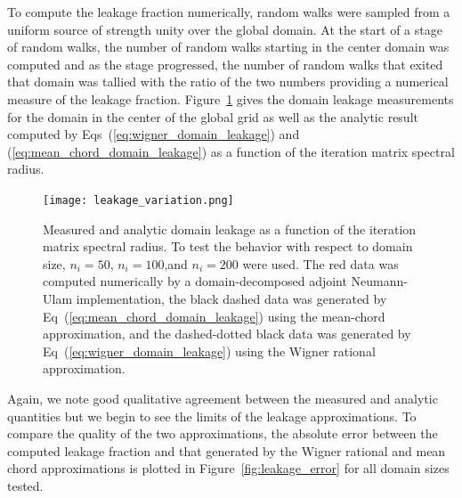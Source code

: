 \documentclass[preprint,11pt]{elsarticle}
\begin{document}
To compute the leakage fraction numerically,  random walks were
sampled from a uniform source of strength unity over the global domain. At the
start of a stage of random walks, the number of random walks starting in the
center domain was computed and as the stage progressed, the number of random
walks that exited that domain was tallied with the ratio of the two numbers
providing a numerical measure of the leakage
fraction. Figure~\ref{fig:measured_leakage} gives the domain leakage
measurements for the domain in the center of the global grid as well as the
analytic result computed by Eqs~(\ref{eq:wigner_domain_leakage}) and
(\ref{eq:mean_chord_domain_leakage}) as a function of the iteration matrix
spectral radius.
\begin{figure}[ht!]
  \begin{center}
    \texttt{[image: leakage\_variation.png]}
  \end{center}
  \caption{Measured and analytic domain leakage as a function of the
    iteration matrix spectral radius. To test the behavior with
    respect to domain size, $n_i=50$, $n_i=100$,and $n_i=200$ were
    used. The red data was computed numerically by a
    domain-decomposed adjoint Neumann-Ulam implementation, the black
    dashed data was generated by
    Eq~(\ref{eq:mean_chord_domain_leakage}) using the mean-chord
    approximation, and the dashed-dotted black data was generated by
    Eq~(\ref{eq:wigner_domain_leakage}) using the Wigner rational
    approximation.}
  \label{fig:measured_leakage}
\end{figure}
Again, we note good qualitative agreement between the measured and
analytic quantities but we begin to see the limits of the leakage
approximations. To compare the quality of the two approximations, the
absolute error between the computed leakage fraction and that
generated by the Wigner rational and mean chord approximations is
plotted in Figure~\ref{fig:leakage_error} for all domain sizes
tested. 
\end{document}
